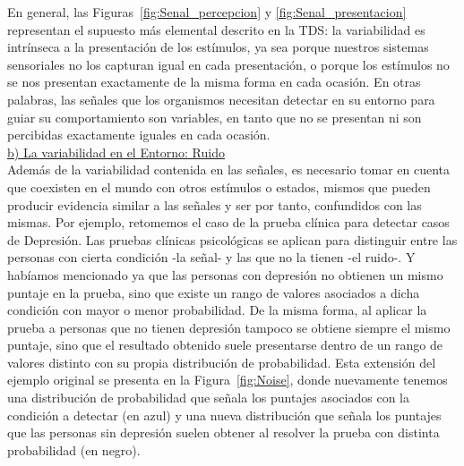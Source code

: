 En general, las Figuras~\ref{fig:Senal_percepcion} y \ref{fig:Senal_presentacion} representan el supuesto más elemental descrito en la TDS: la variabilidad es intrínseca a la presentación de los estímulos, ya sea porque nuestros sistemas sensoriales no los capturan igual en cada presentación, o porque los estímulos no se nos presentan exactamente de la misma forma en cada ocasión. En otras palabras, las señales que los organismos necesitan detectar en su entorno para guiar su comportamiento son variables, en tanto que no se presentan ni son percibidas exactamente iguales en cada ocasión.\\

    \underline{b) La variabilidad en el Entorno: Ruido}\\

Además de la variabilidad contenida en las señales, es necesario tomar en cuenta que coexisten en el mundo con otros estímulos o estados, mismos que pueden producir evidencia similar a las señales y ser por tanto, confundidos con las mismas. Por ejemplo, retomemos el caso de la prueba clínica para detectar casos de Depresión. Las pruebas clínicas psicológicas se aplican para distinguir entre las personas con cierta condición -la señal- y las que no la tienen -el ruido-. Y habíamos mencionado ya que las personas con depresión no obtienen un mismo puntaje en la prueba, sino que existe un rango de valores asociados a dicha condición con mayor o menor probabilidad. De la misma forma, al aplicar la prueba a personas que no tienen depresión tampoco se obtiene siempre el mismo puntaje, sino que el resultado obtenido suele presentarse dentro de un rango de valores distinto con su propia distribución de probabilidad. Esta extensión del ejemplo original se presenta en la Figura~\ref{fig:Noise}, donde nuevamente tenemos una distribución de probabilidad que señala los puntajes asociados con la condición a detectar (en azul) y una nueva distribución que señala los puntajes que las personas sin depresión suelen obtener al resolver la prueba con distinta probabilidad (en negro).\\

